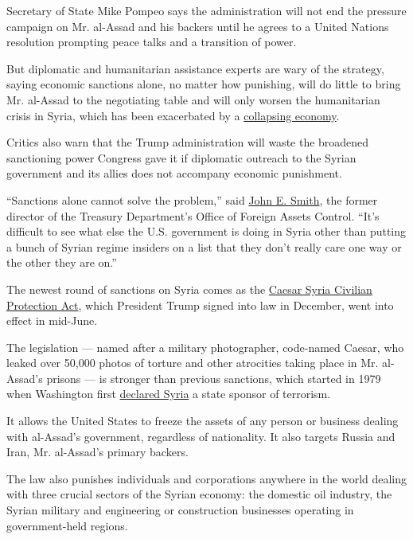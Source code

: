 Secretary of State Mike Pompeo says the administration will not end the
pressure campaign on Mr. al-Assad and his backers until he agrees to a
United Nations resolution prompting peace talks and a transition of
power.

But diplomatic and humanitarian assistance experts are wary of the
strategy, saying economic sanctions alone, no matter how punishing, will
do little to bring Mr. al-Assad to the negotiating table and will only
worsen the humanitarian crisis in Syria, which has been exacerbated by a
\href{https://www.nytimes3xbfgragh.onion/2020/06/15/world/middleeast/syria-economy-assad-makhlouf.html}{collapsing
economy}.

Critics also warn that the Trump administration will waste the broadened
sanctioning power Congress gave it if diplomatic outreach to the Syrian
government and its allies does not accompany economic punishment.

``Sanctions alone cannot solve the problem,'' said
\href{https://www.mofo.com/people/john-smith.html}{John E. Smith}, the
former director of the Treasury Department's Office of Foreign Assets
Control. ``It's difficult to see what else the U.S. government is doing
in Syria other than putting a bunch of Syrian regime insiders on a list
that they don't really care one way or the other they are on.''

The newest round of sanctions on Syria comes as the
\href{https://www.nytimes3xbfgragh.onion/2019/12/16/us/politics/us-syria-sanctions-war-crimes.html}{Caesar
Syria Civilian Protection Act}, which President Trump signed into law in
December, went into effect in mid-June.

The legislation --- named after a military photographer, code-named
Caesar, who leaked over 50,000 photos of torture and other atrocities
taking place in Mr. al-Assad's prisons --- is stronger than previous
sanctions, which started in 1979 when Washington first
\href{https://www.state.gov/state-sponsors-of-terrorism/}{declared
Syria} a state sponsor of terrorism.

It allows the United States to freeze the assets of any person or
business dealing with al-Assad's government, regardless of nationality.
It also targets Russia and Iran, Mr. al-Assad's primary backers.

The law also punishes individuals and corporations anywhere in the world
dealing with three crucial sectors of the Syrian economy: the domestic
oil industry, the Syrian military and engineering or construction
businesses operating in government-held regions.

